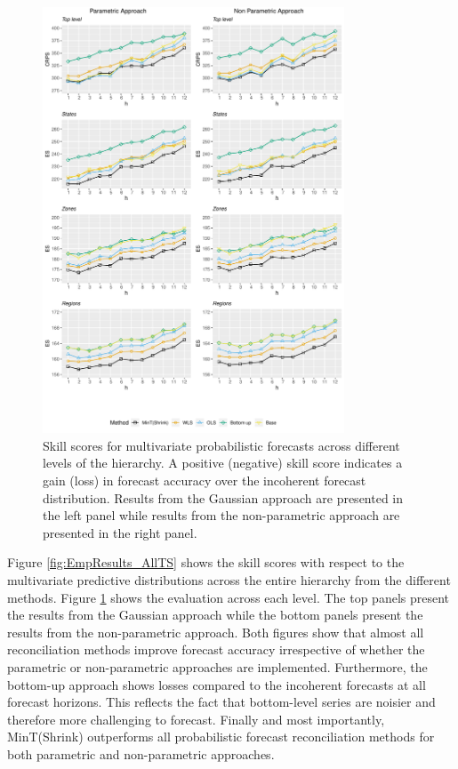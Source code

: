 \documentclass[12pt]{article}
\theoremstyle{definition}
\begin{document}
\begin{figure}
	\centering
	\small
	\includegraphics[width= 0.8\textwidth, height= 0.85\textheight]{Empirical-results/Results-ARIMA/ES_Levels.pdf}
	\caption{Skill scores for multivariate probabilistic forecasts across different levels of the hierarchy. A positive (negative) skill score indicates a gain (loss) in forecast accuracy over the incoherent forecast distribution. Results from the Gaussian approach are presented in the left panel while results from the non-parametric approach are presented in the right panel.}\label{fig:EmpResults_Levels}
\end{figure}

Figure \ref{fig:EmpResults_AllTS} shows the skill scores with respect to the multivariate predictive distributions across the entire hierarchy from the different methods. Figure \ref{fig:EmpResults_Levels} shows the evaluation across each level. The top panels present the results from the Gaussian approach while the bottom panels present the results from the non-parametric approach. Both figures show that almost all reconciliation methods improve forecast accuracy irrespective of whether the parametric or non-parametric approaches are implemented. Furthermore, the bottom-up approach shows losses compared to the incoherent forecasts at all forecast horizons. This reflects the fact that bottom-level series are noisier and therefore more challenging to forecast. Finally and most importantly, MinT(Shrink) outperforms all probabilistic forecast reconciliation methods for both parametric and non-parametric approaches.
\end{document}
